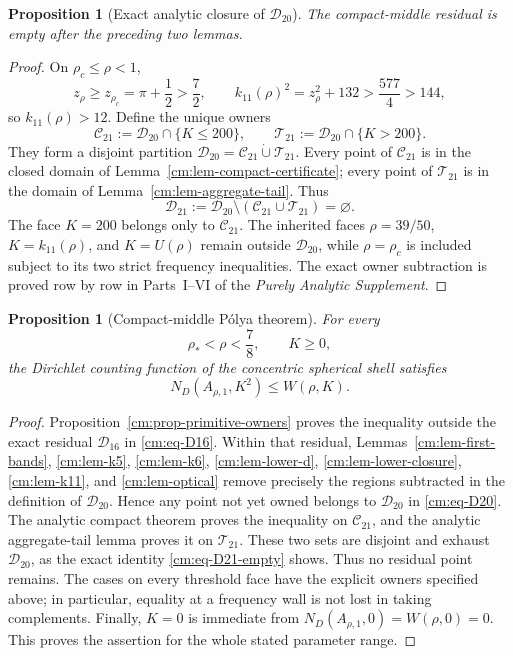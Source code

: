 \documentclass[11pt]{article}
\numberwithin{equation}{section}
\newtheorem{proposition}[theorem]{Proposition}
\theoremstyle{definition}
\theoremstyle{remark}
\begin{document}
\begin{proposition}[Exact analytic closure of \(\mathcal D_{20}\)]
\label{cm:prop-exact-closure}
The compact-middle residual is empty after the preceding two lemmas.
\end{proposition}

\begin{proof}
On \(\rho_c\leq\rho<1\),
\[
 z_\rho\geq z_{\rho_c}=\pi+\frac12>\frac72,
 \qquad
 k_{11}(\rho)^2=z_\rho^2+132>\frac{577}{4}>144,
\]
so \(k_{11}(\rho)>12\).  Define the unique owners
\[
 \mathcal C_{21}:=\mathcal D_{20}\cap\{K\leq200\},
 \qquad
 \mathcal T_{21}:=\mathcal D_{20}\cap\{K>200\}.
\]
They form a disjoint partition
\(\mathcal D_{20}=\mathcal C_{21}\mathbin{\dot\cup}\mathcal T_{21}\).
Every point of \(\mathcal C_{21}\) is in the closed domain of
Lemma~\ref{cm:lem-compact-certificate}; every point of
\(\mathcal T_{21}\) is in the domain of
Lemma~\ref{cm:lem-aggregate-tail}.  Thus
\begin{equation}
 \boxed{\mathcal D_{21}:=\mathcal D_{20}\setminus
 (\mathcal C_{21}\cup\mathcal T_{21})=\varnothing.}
 \label{cm:eq-D21-empty}
\end{equation}
The face \(K=200\) belongs only to \(\mathcal C_{21}\).
The inherited faces \(\rho=39/50\), \(K=k_{11}(\rho)\), and
\(K=U(\rho)\) remain outside \(\mathcal D_{20}\), while
\(\rho=\rho_c\) is included subject to its two strict frequency
inequalities.  The exact owner subtraction is proved row by row in
Parts~I--VI of the \emph{Purely Analytic Supplement}.
\end{proof}

\begin{proposition}[Compact-middle P\'olya theorem]
\label{prop:compact-middle}
For every
\[
 \rho_*<\rho<\frac78,\qquad K\geq0,
\]
the Dirichlet counting function of the concentric spherical shell satisfies
\[
 N_D(A_{\rho,1},K^2)\leq W(\rho,K).
\]
\end{proposition}

\begin{proof}
Proposition~\ref{cm:prop-primitive-owners} proves the inequality outside
the exact residual \(\mathcal D_{16}\) in \eqref{cm:eq-D16}.  Within that
residual, Lemmas~\ref{cm:lem-first-bands}, \ref{cm:lem-k5},
\ref{cm:lem-k6}, \ref{cm:lem-lower-d}, \ref{cm:lem-lower-closure},
\ref{cm:lem-k11}, and \ref{cm:lem-optical} remove precisely the regions
subtracted in the definition of \(\mathcal D_{20}\).  Hence any point not
yet owned belongs to
\(\mathcal D_{20}\) in \eqref{cm:eq-D20}.  The analytic compact theorem proves
the inequality on \(\mathcal C_{21}\), and the analytic aggregate-tail lemma
proves it on \(\mathcal T_{21}\).  These two sets are disjoint and exhaust
\(\mathcal D_{20}\), as the exact identity \eqref{cm:eq-D21-empty} shows.
Thus no residual point remains.  The cases on every threshold face have
the explicit owners specified above; in particular, equality at a
frequency wall is not lost in taking complements.  Finally, \(K=0\) is
immediate from \(N_D(A_{\rho,1},0)=W(\rho,0)=0\).  This proves the assertion for
the whole stated parameter range.
\end{proof}
\end{document}

